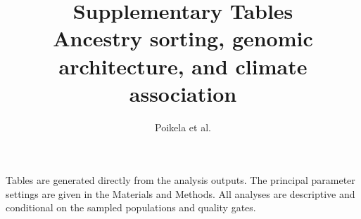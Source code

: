 \documentclass[11pt]{article}
\title{\vspace{-3em}\textbf{\color{Accent}Supplementary Tables}\\[0.3em]
  \Large Ancestry sorting, genomic architecture, and climate association}
\author{Poikela et al.}
\date{}
\begin{document}
\maketitle
\vspace{-1.5em}
\begin{center}\small\color{Muted}
Tables are generated directly from the analysis outputs. The principal parameter
settings are given in the Materials and Methods. All analyses are descriptive and
conditional on the sampled populations and quality gates.
\end{center}







\end{document}
